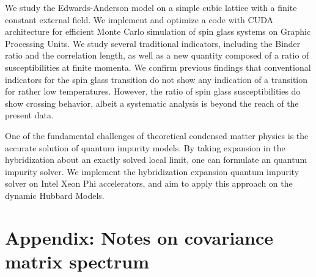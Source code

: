 \documentclass[edeposit,fullpage]{uiucthesis07}
\begin{document}
We study the Edwards-Anderson model on a simple cubic lattice with a finite 
constant external field. We implement and optimize a code with CUDA 
architecture for efficient Monte Carlo simulation of spin glass systems on 
Graphic Processing Units. 
We study several traditional indicators, including the Binder ratio and the 
correlation length, as well as a new quantity composed of 
a ratio of susceptibilities at finite momenta.%
We confirm previous findings that conventional indicators for the 
spin glass transition do not show any indication of a transition for rather 
low temperatures. 
However, the ratio of spin glass susceptibilities do show crossing behavior, 
albeit a systematic analysis is beyond the reach of the present data. 


One of the fundamental challenges of theoretical condensed matter physics is 
the accurate solution of quantum impurity models. By taking expansion in the 
hybridization about an exactly solved local limit, one can formulate an quantum
impurity solver. We implement the hybridization expansion quantum impurity
solver on Intel Xeon Phi accelerators, and aim to apply this approach on the
dynamic Hubbard Models.





\mainmatter





%
%

\backmatter


\appendix
\chapter{Appendix: Notes on covariance matrix spectrum}

\end{document}

